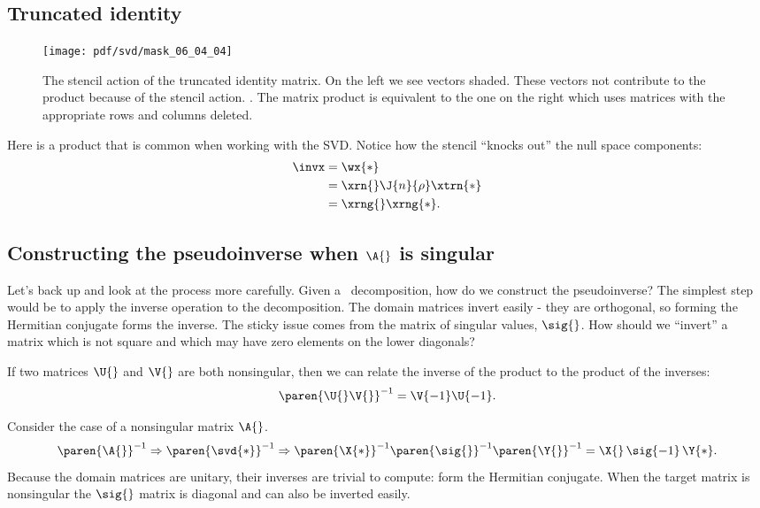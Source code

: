 \subsection{Truncated identity}
\begin{figure}[htbp] %
   \centering
   \texttt{[image: pdf/svd/mask\_06\_04\_04]} 
   \caption[The stencil action of the truncated identity matrix]{The stencil action of the truncated identity matrix. On the left we see vectors shaded. These vectors not contribute to the product because of the stencil action. . The matrix product is equivalent to the one on the right which uses matrices with the appropriate rows and columns deleted.}
   \label{fig:svd:stencil}
\end{figure}
Here is a product that is common when working with the SVD. Notice how the stencil ``knocks out'' the null space components:
\begin{equation}
  \begin{split}
    \invx & = \wx{*} \\
    &= \xrn{} \J{n}{\rho} \xtrn{*} \\
    &= \xrng{} \xrng{*}.
  \end{split}
\end{equation}


\subsection[Construction: general case]{Constructing the pseudoinverse when $\A{}$ is singular}
Let's back up and look at the process more carefully.
Given a \svdl \ decomposition, how do we construct the pseudoinverse? The simplest step would be to apply the inverse operation to the decomposition. The domain matrices invert easily - they are orthogonal, so forming the Hermitian conjugate forms the inverse. The sticky issue comes from the matrix of singular values, $\sig{}$. How should we ``invert'' a matrix which is not square and which may have zero elements on the lower diagonals?

If two matrices $\U{}$ and $\V{}$ are both nonsingular, then we can relate the inverse of the product to the product of the inverses:
\begin{equation}
  \paren{\U{}\V{}}^{-1} = \V{-1}\U{-1}.
\end{equation}

Consider the case of a nonsingular matrix $\A{}$.
\begin{equation}
  \paren{\A{}}^{-1} \Rightarrow \paren{\svd{*}}^{-1} \Rightarrow \paren{\X{*}}^{-1}\paren{\sig{}}^{-1}\paren{\Y{}}^{-1}=\X{}\,\sig{-1}\,\Y{*}.
\end{equation}
Because the domain matrices are unitary, their inverses are trivial to compute: form the Hermitian conjugate. When the target matrix is nonsingular the $\sig{}$ matrix is diagonal and can also be inverted easily.

